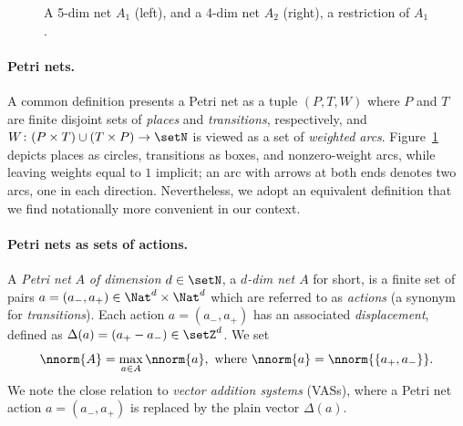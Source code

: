 \begin{figure}[t]
\begin{center}
\end{center}
\caption{A 5-dim net $A_1$ (left), and a 4-dim net $A_2$
	(right), a restriction of $A_1$.}
    \label{fig:example}
\end{figure}

\paragraph{Petri nets.}
A common definition presents a Petri net as a tuple $(P,T,W)$ where $P$ and
$T$ are finite disjoint sets of \emph{places} and \emph{transitions},
respectively, and $W\colon (P\times T)\cup(T\times P)\to \setN$
is viewed as a set of \emph{weighted arcs}.
Figure~\ref{fig:example} 
depicts places as circles, transitions as boxes, and nonzero-weight
arcs, while leaving weights equal to $1$ implicit; an arc with arrows
at both ends denotes two arcs, one in each direction. 
Nevertheless, we adopt an equivalent definition that we find notationally more convenient in our context.

\paragraph{Petri nets as sets of actions.}
A \emph{Petri net} $A$ \emph{of dimension} $d\in\setN$, a
\emph{$d$-dim net $A$} for short, is a finite set of pairs
$a=(a_-,a_+) \in \Nat^d \times \Nat^d$ 
which are referred to as 
 \emph{actions} (a synonym for \emph{transitions}).
 Each action $a=(a_-,a_+)$ has an associated \emph{displacement},
defined as $\Delta(a)=(a_+-a_-)\in\setZ^d$. 
We set 
	\[
	\nnorm{A}=\max_{a\in A}\nnorm{a},
	\textnormal{ where }
\nnorm{a}=\nnorm{\{a_+,a_-\}}.
\]
We note the close relation to \emph{vector addition
	systems} (VASs), where a Petri net action
$a=(a_-,a_+)$ is replaced by the plain vector $\Delta(a)$.

